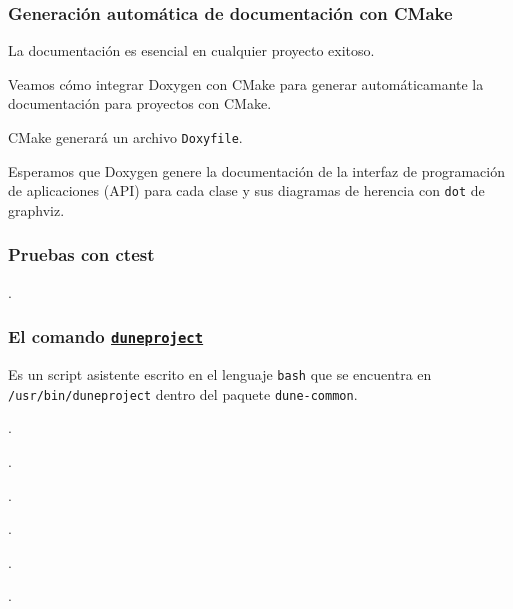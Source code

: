 \begin{frame}[fragile]
	\frametitle{Generación automática de documentación con CMake}
	La documentación es esencial en cualquier proyecto exitoso.

	Veamos cómo integrar Doxygen con CMake para generar
	automáticamante la documentación para proyectos con CMake.

	CMake generará un archivo \lstinline{Doxyfile}.

	Esperamos que Doxygen genere la documentación de la interfaz de
	programación de aplicaciones (API) para cada clase y sus
	diagramas de herencia con \lstinline{dot} de graphviz.
\end{frame}

\begin{frame}[fragile]
	\frametitle{Pruebas con ctest}
	.
\end{frame}



\begin{frame}[fragile]
	\frametitle{El comando \href{https://gitlab.dune-project.org/core/dune-common/-/raw/master/bin/duneproject}{\lstinline{duneproject}}}

	Es un script asistente escrito en el lenguaje \lstinline{bash}
	que se encuentra en \lstinline{/usr/bin/duneproject}
	dentro del paquete \lstinline{dune-common}.
\end{frame}

\begin{frame}
	.
\end{frame}

\begin{frame}
	.
\end{frame}

\begin{frame}
	.
\end{frame}

\begin{frame}
	.
\end{frame}

\begin{frame}
	.
\end{frame}

\begin{frame}
	.
\end{frame}


